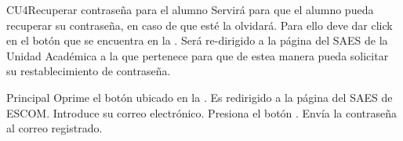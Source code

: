 \begin{UseCase}{CU4}{Recuperar contraseña para el alumno}{
			\noindent Servirá para que el alumno pueda recuperar su contraseña, en caso de que esté la olvidará. Para ello deve dar click en el botón  que se encuentra en la . 
		Será re-dirigido a la página del SAES de la Unidad Académica a la que pertenece para que de estea manera pueda solicitar su restablecimiento de contraseña.	
}
		\label{CU4_Recuperaalum}
	
\end{UseCase}
\begin{UCtrayectoria}{Principal}
	\UCpaso[\UCactor] Oprime el botón  ubicado en la .
	\UCpaso Es redirigido a la página del SAES de ESCOM.
	\UCpaso[\UCactor] Introduce su correo electrónico.
	\UCpaso[\UCactor] Presiona el botón .
	\UCpaso Envía la contraseña al correo registrado.
\end{UCtrayectoria}
